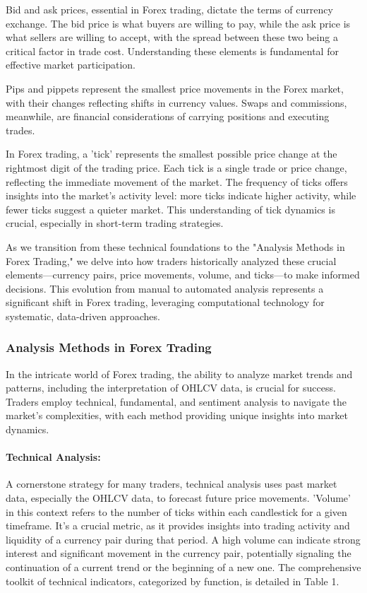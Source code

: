 Bid and ask prices, essential in Forex trading, dictate the terms of currency exchange. The bid price is what buyers are willing to pay, while the ask price is what sellers are willing to accept, with the spread between these two being a critical factor in trade cost. Understanding these elements is fundamental for effective market participation.

Pips and pippets represent the smallest price movements in the Forex market, with their changes reflecting shifts in currency values. Swaps and commissions, meanwhile, are financial considerations of carrying positions and executing trades.

In Forex trading, a 'tick' represents the smallest possible price change at the rightmost digit of the trading price. Each tick is a single trade or price change, reflecting the immediate movement of the market. The frequency of ticks offers insights into the market's activity level: more ticks indicate higher activity, while fewer ticks suggest a quieter market. This understanding of tick dynamics is crucial, especially in short-term trading strategies.

As we transition from these technical foundations to the "Analysis Methods in Forex Trading," we delve into how traders historically analyzed these crucial elements—currency pairs, price movements, volume, and ticks—to make informed decisions. This evolution from manual to automated analysis represents a significant shift in Forex trading, leveraging computational technology for systematic, data-driven approaches.

\subsubsection{Analysis Methods in Forex Trading}

In the intricate world of Forex trading, the ability to analyze market trends and patterns, including the interpretation of OHLCV data, is crucial for success. Traders employ technical, fundamental, and sentiment analysis to navigate the market's complexities, with each method providing unique insights into market dynamics.

\paragraph{Technical Analysis:}
A cornerstone strategy for many traders, technical analysis uses past market data, especially the OHLCV data, to forecast future price movements. 'Volume' in this context refers to the number of ticks within each candlestick for a given timeframe. It's a crucial metric, as it provides insights into trading activity and liquidity of a currency pair during that period. A high volume can indicate strong interest and significant movement in the currency pair, potentially signaling the continuation of a current trend or the beginning of a new one. The comprehensive toolkit of technical indicators, categorized by function, is detailed in Table 1.

